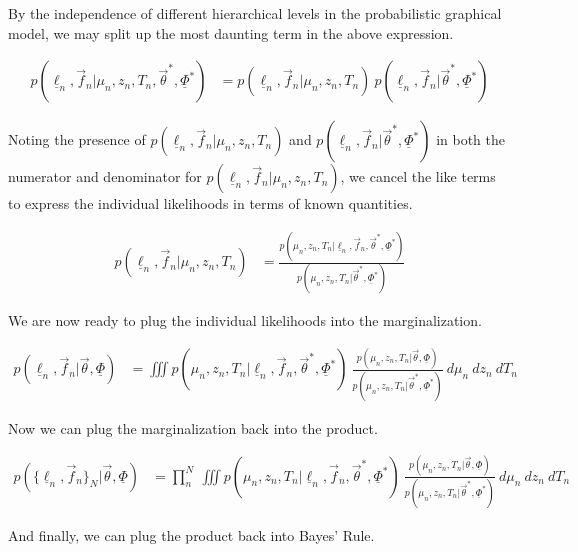 \documentclass[12pt, onecolumn]{emulateapj}
\newcommand{\textul}{\underline}
\begin{document}
By the independence of different hierarchical levels in the probabilistic graphical model, we may split up the most daunting term in the above expression.

\begin{align}
p(\textul{\ell}_{n}, \vec{f}_{n} | \mu_{n}, z_{n}, T_{n}, \vec{\theta}^{*}, \textul{\Phi}^{*}) &= p(\textul{\ell}_{n}, \vec{f}_{n} | \mu_{n}, z_{n}, T_{n})\ p(\textul{\ell}_{n}, \vec{f}_{n} | \vec{\theta}^{*}, \textul{\Phi}^{*})
\end{align}

Noting the presence of $p(\textul{\ell}_{n}, \vec{f}_{n} | \mu_{n}, z_{n}, T_{n})$ and $p(\textul{\ell}_{n}, \vec{f}_{n} | \vec{\theta}^{*}, \textul{\Phi}^{*})$ in both the numerator and denominator for $p(\textul{\ell}_{n}, \vec{f}_{n} | \mu_{n}, z_{n}, T_{n})$, we cancel the like terms to express the individual likelihoods in terms of known quantities.

\begin{align}
p(\textul{\ell}_{n}, \vec{f}_{n} | \mu_{n}, z_{n}, T_{n}) &= \frac{p(\mu_{n}, z_{n}, T_{n} | \textul{\ell}_{n}, \vec{f}_{n}, \vec{\theta}^{*}, \textul{\Phi}^{*})}{p(\mu_{n}, z_{n}, T_{n} | \vec{\theta}^{*}, \textul{\Phi}^{*})}
\end{align}

We are now ready to plug the individual likelihoods into the marginalization.

\begin{align}
p(\textul{\ell}_{n}, \vec{f}_{n} | \vec{\theta}, \textul{\Phi}) &= \iiint p(\mu_{n}, z_{n}, T_{n} | \textul{\ell}_{n}, \vec{f}_{n}, \vec{\theta}^{*}, \textul{\Phi}^{*})\ \frac{p(\mu_{n}, z_{n}, T_{n} | \vec{\theta}, \textul{\Phi})}{p(\mu_{n}, z_{n}, T_{n} | \vec{\theta}^{*}, \textul{\Phi}^{*})}\ d\mu_{n}\ dz_{n}\ dT_{n}
\end{align}

Now we can plug the marginalization back into the product.

\begin{align}
p(\{\textul{\ell}_{n}, \vec{f}_{n}\}_{N} | \vec{\theta}, \textul{\Phi}) &= \prod_{n}^{N}\ \iiint p(\mu_{n}, z_{n}, T_{n} | \textul{\ell}_{n}, \vec{f}_{n}, \vec{\theta}^{*}, \textul{\Phi}^{*})\ \frac{p(\mu_{n}, z_{n}, T_{n} | \vec{\theta}, \textul{\Phi})}{p(\mu_{n}, z_{n}, T_{n} | \vec{\theta}^{*}, \textul{\Phi}^{*})}\ d\mu_{n}\ dz_{n}\ dT_{n}
\end{align}

And finally, we can plug the product back into Bayes' Rule.
\end{document}
